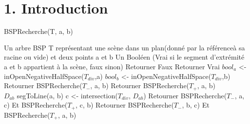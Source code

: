 \documentclass[a4paper,12pt]{report}	%
\begin{document}

	\umonsCoverPage		%
	
	
	\begin{abstract}	%
		...
	\end{abstract}
	
	\clearpage			%
	\tableofcontents
	


	\clearpage			%
	
	{\section*{1. Introduction}}
	
	\begin{algorithm}
	\caption{BSPRecherche(T, a, b)}
	\label{Modele pour un algo}
	\begin{algorithmic} [1]
	\REQUIRE Un arbre BSP T représentant une scène dans un plan(donné par la référenceà sa racine ou vide) et deux points a et b
	\ENSURE Un Booléen (Vrai si le segment d'extrémité a et b appartient à la scène, faux sinon)
	\STATE Retourner Faux
	\ELSE
	\STATE Retourner Vrai
	\ELSE 
	\STATE $bool_a$ <- inOpenNegativeHalfSpace($T_{div}$,a)
	\STATE $bool_b$ <- inOpenNegativeHalfSpace($T_{div}$,b)
	\STATE Retourner BSPRecherche($T_{-}$, a, b)
	\ELSE
	\STATE Retourner BSPRecherche($T_{+}$, a, b)\\
	\ELSE
	\STATE $D_{ab}$ segToLine(a, b)
	\STATE c <- intersection($T_{div}$, $D_{ab}$)
	\STATE Retourner BSPRecherche($T_{-}$, a, c) Et BSPRecherche($T_{+}$, c, b)
	\ELSE
	\STATE Retourner BSPRecherche($T_{-}$, b, c) Et BSPRecherche($T_{+}$, a, b)
	\ENDIF
	\ENDIF
	\ENDIF
	\ENDIF
	\ENDIF
	\end{algorithmic}
	\end{algorithm}
\end{document}
